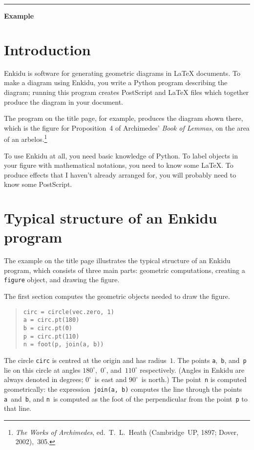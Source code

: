 \documentclass{enkidudoc}
\begin{document}

\setcounter{page}{0}
\maketitle
\tableofcontents
\thispagestyle{fancy}

\vspace{\baselineskip}\hrule\vspace{\baselineskip}
\centerline{\textbf{Example}}

\pagebreak
\section{Introduction}

Enkidu is software for generating geometric diagrams in \LaTeX{} documents.
To make a diagram using Enkidu,
you write a Python program describing the diagram;
running this program creates PostScript and \LaTeX{} files
which together produce the diagram in your document.

The program on the title page, for example, produces the diagram shown there,
which is the figure for Proposition~4 of Archimedes'
\textit{Book of Lemmas},
on the area of an arbelos.\footnote{\textit{The Works of Archimedes},
ed.~T.~L.~Heath (Cambridge~UP, 1897; Dover, 2002),~305.}

To use Enkidu at all, you need basic knowledge of Python.
To label objects in your figure with mathematical notations,
you need to know some \LaTeX.
To produce effects that I haven't already arranged for,
you will probably need to know some PostScript.

\section{Typical structure of an Enkidu program}

The example on the title page illustrates the typical structure
of an Enkidu program, which consists of three main parts:
geometric computations,
creating a \texttt{figure} object,
and drawing the figure.

The first section computes the geometric objects needed to draw the figure.
\begin{quote}{\small\begin{verbatim}
circ = circle(vec.zero, 1)
a = circ.pt(180)
b = circ.pt(0)
p = circ.pt(110)
n = foot(p, join(a, b))
\end{verbatim}}\end{quote}
The circle \texttt{circ} is centred at the origin and has radius~$1$.
The points \texttt{a},~\texttt{b}, and~\texttt{p}
lie on this circle at angles $180^\circ$,~$0^\circ$, and~$110^\circ$
respectively.
(Angles in Enkidu are always denoted in degrees;
$0^\circ$~is east and $90^\circ$~is north.)
The point~\texttt{n} is computed geometrically:
the expression~\texttt{join(a,~b)} computes the
line through the points \texttt{a}~and~\texttt{b},
and \texttt{n}~is computed as the foot of the perpendicular
from the point~\texttt{p} to that line.
\end{document}
